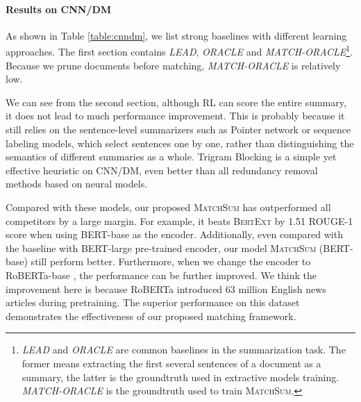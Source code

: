 \paragraph{Results on CNN/DM}
As shown in Table \ref{table:cnndm}, we list strong baselines with different learning approaches.
The first section contains \textit{LEAD}, \textit{ORACLE} and \textit{MATCH-ORACLE}\footnote{\textit{LEAD} and \textit{ORACLE} are common baselines in the summarization task. The former means extracting the first several sentences of a document as a summary, the latter is the groundtruth used in extractive models training. \textit{MATCH-ORACLE} is the groundtruth used to train \textsc{MatchSum}.}. Because we prune documents before matching, \textit{MATCH-ORACLE} is relatively low.

We can see from the second section, although RL can score the entire summary, it does not lead to much performance improvement. This is probably because it still relies on the sentence-level summarizers such as Pointer network or sequence labeling models, which select sentences one by one, rather than distinguishing the semantics of different summaries as a whole. Trigram Blocking is a simple yet effective heuristic on CNN/DM, even better than all redundancy removal methods based on neural models.

Compared with these models, our proposed \textsc{MatchSum} has outperformed all competitors by a large margin. For example, it beats \textsc{BertExt} by 1.51 ROUGE-1 score when using BERT-base as the encoder. Additionally, even compared with the baseline with BERT-large pre-trained encoder, our model \textsc{MatchSum} (BERT-base) still perform better. Furthermore, when we change the encoder to RoBERTa-base \cite{liu2019roberta}, the performance can be further improved. We think the improvement here is because RoBERTa introduced 63 million English news articles during pretraining. The superior performance on this dataset demonstrates the effectiveness of our proposed matching framework.

